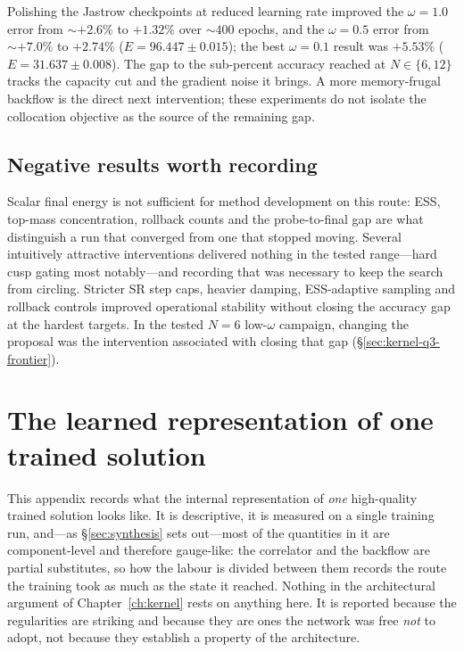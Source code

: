 Polishing the Jastrow checkpoints at reduced learning rate improved the $\omega{=}1.0$ error
from ${\sim}{+}2.6\%$ to $+1.32\%$ over ${\sim}400$ epochs, and the $\omega{=}0.5$ error from
${\sim}{+}7.0\%$ to $+2.74\%$ ($E=96.447\pm0.015$); the best $\omega{=}0.1$ result was
$+5.53\%$ ($E=31.637\pm0.008$). The gap to the sub-percent accuracy reached at $N\in\{6,12\}$
tracks the capacity cut and the gradient noise it brings. A more memory-frugal backflow is
the direct next intervention; these experiments do not isolate the collocation objective as
the source of the remaining gap.

\section{Negative results worth recording}
\label{app:postcatch22:summary}

Scalar final energy is not sufficient for method development on this route: ESS, top-mass
concentration, rollback counts and the probe-to-final gap are what distinguish a run that
converged from one that stopped moving. Several intuitively attractive interventions
delivered nothing in the tested range---hard cusp gating most notably---and recording that
was necessary to keep the search from circling. Stricter SR step caps, heavier
damping, ESS-adaptive sampling and rollback controls improved operational stability without
closing the accuracy gap at the hardest targets. In the tested $N{=}6$ low-$\omega$
campaign, changing the proposal was the intervention associated with closing that gap
(\S\ref{sec:kernel-q3-frontier}).


\chapter{The learned representation of one trained solution}
\label{app:representation}

This appendix records what the internal representation of \emph{one} high-quality trained
solution looks like. It is descriptive, it is measured on a single training run, and---as
\S\ref{sec:synthesis} sets out---most of the quantities in it are component-level and
therefore gauge-like: the correlator and the backflow are partial substitutes, so how the
labour is divided between them records the route the training took as much as the state it
reached. Nothing in the architectural argument of Chapter~\ref{ch:kernel} rests on anything
here. It is reported because the regularities are striking and because they are ones the
network was free \emph{not} to adopt, not because they establish a property of the
architecture.

